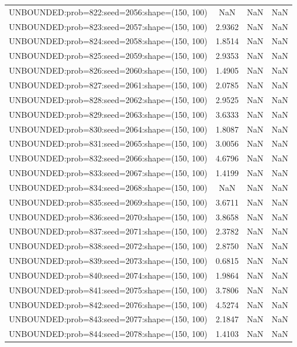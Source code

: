 \begin{longtable}{lccc}
UNBOUNDED:prob=822:seed=2056:shape=(150, 100) &     NaN &   NaN &    NaN \\
UNBOUNDED:prob=823:seed=2057:shape=(150, 100) &  2.9362 &   NaN &    NaN \\
UNBOUNDED:prob=824:seed=2058:shape=(150, 100) &  1.8514 &   NaN &    NaN \\
UNBOUNDED:prob=825:seed=2059:shape=(150, 100) &  2.9353 &   NaN &    NaN \\
UNBOUNDED:prob=826:seed=2060:shape=(150, 100) &  1.4905 &   NaN &    NaN \\
UNBOUNDED:prob=827:seed=2061:shape=(150, 100) &  2.0785 &   NaN &    NaN \\
UNBOUNDED:prob=828:seed=2062:shape=(150, 100) &  2.9525 &   NaN &    NaN \\
UNBOUNDED:prob=829:seed=2063:shape=(150, 100) &  3.6333 &   NaN &    NaN \\
UNBOUNDED:prob=830:seed=2064:shape=(150, 100) &  1.8087 &   NaN &    NaN \\
UNBOUNDED:prob=831:seed=2065:shape=(150, 100) &  3.0056 &   NaN &    NaN \\
UNBOUNDED:prob=832:seed=2066:shape=(150, 100) &  4.6796 &   NaN &    NaN \\
UNBOUNDED:prob=833:seed=2067:shape=(150, 100) &  1.4199 &   NaN &    NaN \\
UNBOUNDED:prob=834:seed=2068:shape=(150, 100) &     NaN &   NaN &    NaN \\
UNBOUNDED:prob=835:seed=2069:shape=(150, 100) &  3.6711 &   NaN &    NaN \\
UNBOUNDED:prob=836:seed=2070:shape=(150, 100) &  3.8658 &   NaN &    NaN \\
UNBOUNDED:prob=837:seed=2071:shape=(150, 100) &  2.3782 &   NaN &    NaN \\
UNBOUNDED:prob=838:seed=2072:shape=(150, 100) &  2.8750 &   NaN &    NaN \\
UNBOUNDED:prob=839:seed=2073:shape=(150, 100) &  0.6815 &   NaN &    NaN \\
UNBOUNDED:prob=840:seed=2074:shape=(150, 100) &  1.9864 &   NaN &    NaN \\
UNBOUNDED:prob=841:seed=2075:shape=(150, 100) &  3.7806 &   NaN &    NaN \\
UNBOUNDED:prob=842:seed=2076:shape=(150, 100) &  4.5274 &   NaN &    NaN \\
UNBOUNDED:prob=843:seed=2077:shape=(150, 100) &  2.1847 &   NaN &    NaN \\
UNBOUNDED:prob=844:seed=2078:shape=(150, 100) &  1.4103 &   NaN &    NaN \\

\end{longtable}
